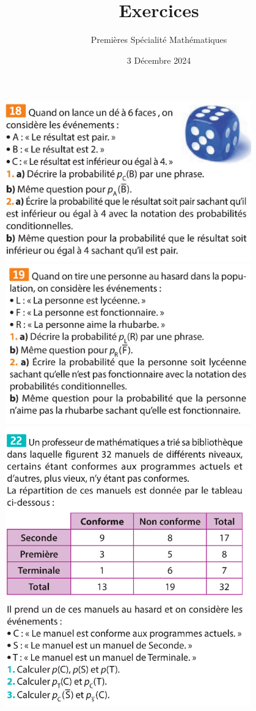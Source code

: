 \documentclass{article}
\title{Exercices}
\author{Premières Spécialité Mathématiques}
\date{3 Décembre 2024}
\begin{document}
\maketitle

\begin{center}
\includegraphics[width=0.8\textwidth]{Exercice_1.png}
\includegraphics[width=0.8\textwidth]{Exercice_2.png}
\includegraphics[width=0.8\textwidth]{Exercice_3.png}
\end{center}
\end{document}

